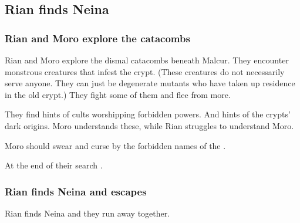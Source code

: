 \begin{garbage}









\subsection{Rian finds Neina}
\subsubsection{Rian and Moro explore the catacombs}
Rian and Moro \Cornel{} explore the dismal catacombs beneath Malcur. 
They encounter monstrous creatures that infest the crypt. 
(These creatures do not necessarily serve anyone. They can just be degenerate mutants who have taken up residence in the old crypt.) 
They fight some of them and flee from more. 

They find hints of cults worshipping forbidden powers. And hints of the crypts' dark origins. Moro understands these, while Rian struggles to understand Moro. 

Moro should swear and curse by the forbidden names of the \xss.


At the end of their search .




\subsubsection{Rian finds Neina and escapes}
Rian finds Neina and they run away together. 


\end{garbage}
